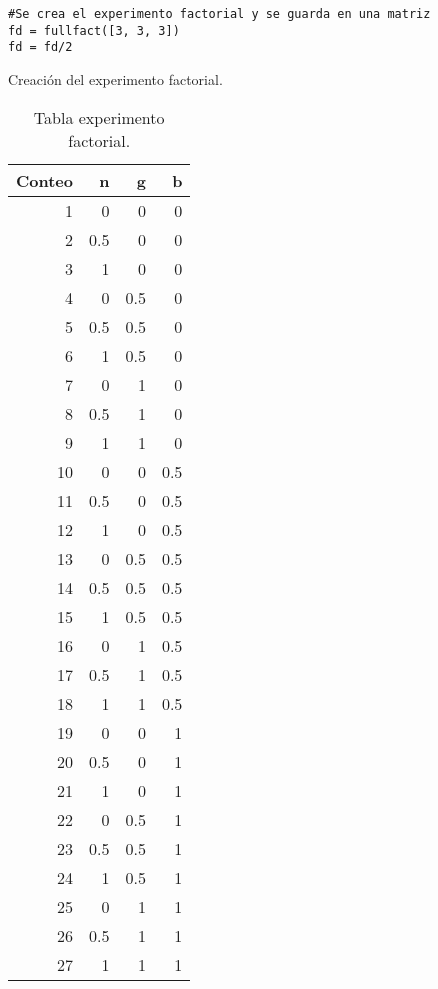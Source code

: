 \documentclass{article}
\begin{document}
\renewcommand{\listingscaption}{Código}
\begin{listing}[H]
  \begin{verbatim}
#Se crea el experimento factorial y se guarda en una matriz
fd = fullfact([3, 3, 3])
fd = fd/2
      \end{verbatim}
  \label{lst:fibo}
  \caption{Creación del experimento factorial.}
\end{listing}

\begin{table}[h!]
\centering
\caption{Tabla experimento factorial.}
 \begin{tabular}{||r r r r||} 
 \hline
 Conteo & n & g & b  \\ [0.5ex] 
 \hline\hline
 1 & 0 & 0 & 0 \\
 \hline
 2 & 0.5 & 0 & 0\\ 
 \hline
 3 & 1 & 0 & 0  \\
 \hline
 4 & 0 & 0.5 & 0 \\
 \hline
 5 & 0.5 & 0.5 & 0 \\
 \hline
 6 & 1 & 0.5 & 0 \\
 \hline
 7 & 0 & 1 & 0 \\
 \hline
 8 & 0.5 & 1 & 0 \\
 \hline
 9 & 1 &  1 & 0  \\
 \hline
 10 & 0 & 0 & 0.5 \\
 \hline
 11 & 0.5 & 0 & 0.5 \\
 \hline
 12 & 1 & 0 & 0.5 \\
 \hline
 13 & 0 & 0.5 & 0.5 \\
 \hline
 14 & 0.5 & 0.5 & 0.5 \\
 \hline
 15 & 1 & 0.5 & 0.5 \\
 \hline
 16 & 0 & 1 & 0.5 \\
 \hline
 17 & 0.5 & 1 & 0.5\\
 \hline
 18 & 1 & 1 & 0.5 \\
 \hline
 19 & 0 & 0 & 1 \\
 \hline
 20 & 0.5 & 0 & 1 \\
 \hline
 21 & 1 & 0 & 1\\
 \hline
 22 & 0 & 0.5 & 1 \\
 \hline
 23 & 0.5 & 0.5 & 1 \\
 \hline
 24 & 1 & 0.5 & 1 \\
 \hline
 25 & 0 & 1 & 1 \\
 \hline
 26 & 0.5 & 1 & 1\\
 \hline
 27 & 1 & 1 & 1\\
 \hline
\end{tabular}
\label{table:1}
\end{table}
\end{document}
